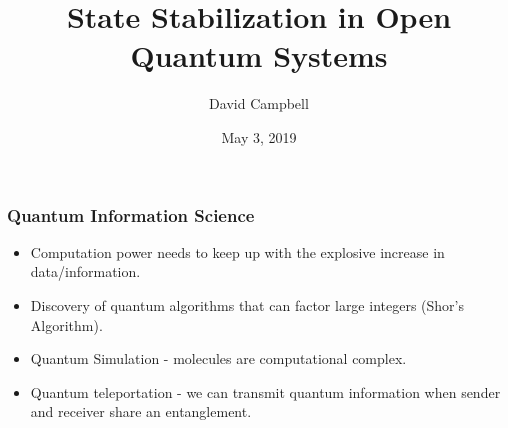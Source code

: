\documentclass{beamer}
\title{State Stabilization in Open Quantum Systems}
\author{David Campbell}
\institute{UMass Lowell}
\date{May 3, 2019}
\begin{document}
\begin{frame}
\titlepage
\end{frame}

\begin{frame}
\frametitle{ Quantum Information Science }

\begin{itemize}

\item Computation power needs to keep up with the explosive increase in data/information.
\item Discovery of quantum algorithms that can factor large integers (Shor's Algorithm).
\item Quantum Simulation - molecules are computational complex.
\item Quantum teleportation - we can transmit quantum information when sender and receiver share an entanglement.

\end{itemize}

\end{frame}
\end{document}
